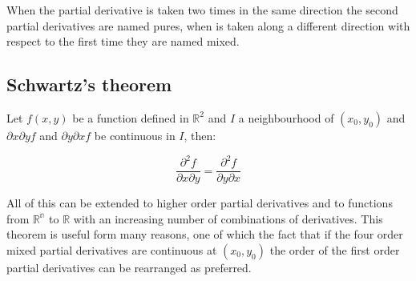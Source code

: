 When the partial derivative is taken two times in the same direction the second partial derivatives are named pures, when is taken along a different direction with respect to the first time they are named mixed.

	\subsection{Schwartz's theorem}
	Let $f(x, y)$ be a function defined in $\mathbb{R}^2$ and $I$ a neighbourhood of $(x_0, y_0)$ and $\partial x\partial y f$ and $\partial y\partial x f$ be continuous in $I$, then:

	$$\frac{\partial^2 f}{\partial x\partial y} = \frac{\partial ^2 f}{\partial y\partial x}$$

	All of this can be extended to higher order partial derivatives and to functions from $\mathbb{R^n}$ to $\mathbb{R}$ with an increasing number of combinations of derivatives.
	This theorem is useful form many reasons, one of which the fact that if the four order mixed partial derivatives are continuous at $(x_0, y_0)$ the order of the first order partial derivatives can be rearranged as preferred.
